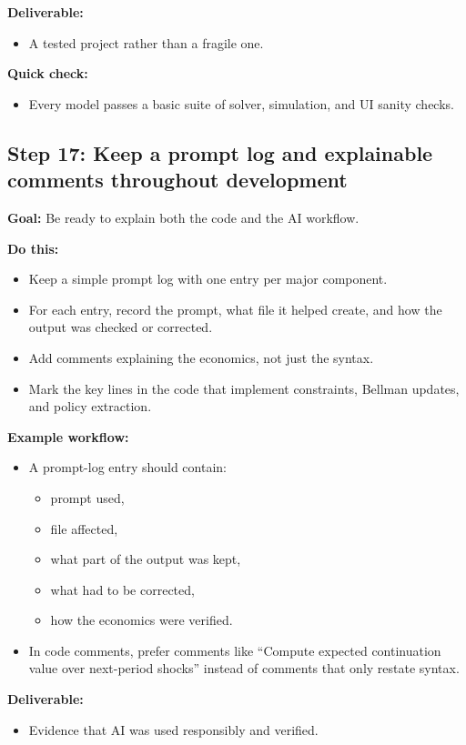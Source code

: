 \documentclass[11pt]{article}
\begin{document}
\textbf{Deliverable:}
\begin{itemize}
    \item A tested project rather than a fragile one.
\end{itemize}

\textbf{Quick check:}
\begin{itemize}
    \item Every model passes a basic suite of solver, simulation, and UI sanity checks.
\end{itemize}

\subsection{Step 17: Keep a prompt log and explainable comments throughout development}
\textbf{Goal:} Be ready to explain both the code and the AI workflow.

\textbf{Do this:}
\begin{itemize}
    \item Keep a simple prompt log with one entry per major component.
    \item For each entry, record the prompt, what file it helped create, and how the output was checked or corrected.
    \item Add comments explaining the economics, not just the syntax.
    \item Mark the key lines in the code that implement constraints, Bellman updates, and policy extraction.
\end{itemize}

\textbf{Example workflow:}
\begin{itemize}
    \item A prompt-log entry should contain:
    \begin{itemize}
        \item prompt used,
        \item file affected,
        \item what part of the output was kept,
        \item what had to be corrected,
        \item how the economics were verified.
    \end{itemize}
    \item In code comments, prefer comments like ``Compute expected continuation value over next-period shocks'' instead of comments that only restate syntax.
\end{itemize}

\textbf{Deliverable:}
\begin{itemize}
    \item Evidence that AI was used responsibly and verified.
\end{itemize}
\end{document}
